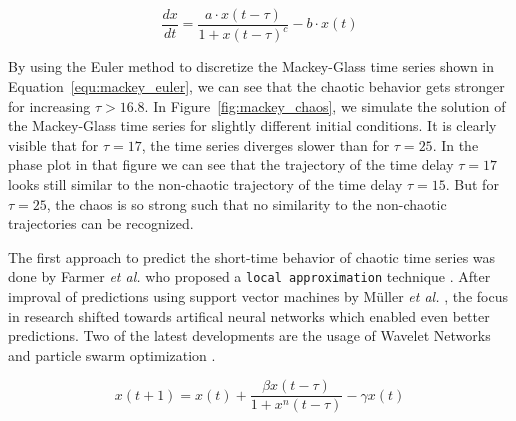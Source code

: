 \documentclass{article}
\begin{document}
\begin{equation}
    \frac{dx}{dt} = \frac{a \cdot x(t - \tau)}{1 + x(t - \tau)^c} - b \cdot x(t)
    \label{equ:mackey}
\end{equation}

By using the Euler method to discretize the Mackey-Glass time series shown in 
Equation~\ref{equ:mackey_euler}, we can
see that the chaotic behavior gets stronger for increasing $\tau > 16.8$. In
Figure~\ref{fig:mackey_chaos}, we simulate the solution of the Mackey-Glass
time series for slightly different initial conditions. It is clearly visible
that for $\tau = 17$, the time series diverges slower than for $\tau = 25$. In 
the phase plot in that figure we can see that the trajectory of the time delay 
$\tau = 17$ looks still similar to the non-chaotic trajectory of the time delay
$\tau = 15$. But for $\tau=25$, the chaos is so strong such that no similarity 
to the non-chaotic trajectories can be recognized.

The first approach to predict the short-time behavior of chaotic time series
was done by Farmer \textit{et al.} who proposed a \texttt{local approximation}
technique \cite{farmer1987}. After improval of predictions using support vector
machines by Müller \textit{et al.} \cite{muller1997}, the focus in research
shifted towards artifical neural networks which enabled even better predictions.
Two of the latest developments are the usage of Wavelet Networks
\cite{alexandridis2013} and particle swarm optimization \cite{lopez2016}.

\begin{equation}
    x(t+1) = x(t) + \frac{\beta x(t - \tau)}{1 + x^{n}(t - \tau)} - \gamma x(t)
    \label{equ:mackey_euler}
\end{equation}
\end{document}
